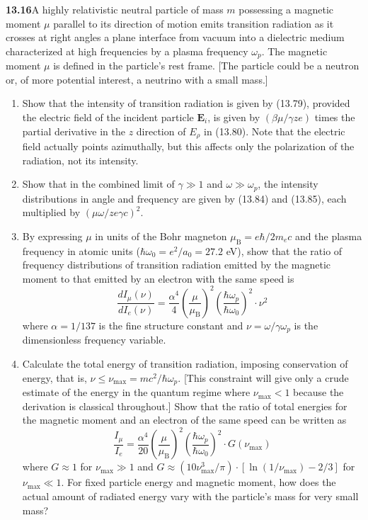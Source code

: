 \par\bigskip
\noindent\textbf{13.16}\quad A highly relativistic neutral particle of mass $m$ possessing a magnetic moment $\mu$ parallel to its direction of motion emits transition radiation as it crosses at right angles a plane interface from vacuum into a dielectric medium characterized at high frequencies by a plasma frequency $\omega_{p}$. The magnetic moment $\mu$ is defined in the particle's rest frame. [The particle could be a neutron or, of more potential interest, a neutrino with a small mass.]
\begin{enumerate}
\item[(a)] Show that the intensity of transition radiation is given by (13.79), provided the electric field of the incident particle $\mathbf{E}_{i}$, is given by $(\beta\mu/\gamma ze)$ times the partial derivative in the $z$ direction of $E_{\rho}$ in (13.80). Note that the electric field actually points azimuthally, but  this affects only the polarization of the radiation, not its intensity.
\item[(b)] Show that in the combined limit of $\gamma\gg1$ and $\omega\gg\omega_{p}$, the intensity distributions in angle and frequency are given by (13.84) and (13.85), each multiplied by $(\mu\omega/ze\gamma c)^{2}$.
\item[(c)] By expressing $\mu$ in units of the Bohr magneton $\mu_{\mathrm{B}}=e\hbar/2m_{e}c$ and the plasma frequency in atomic units ($\hbar\omega_{0}=e^{2}/a_{0}=27.2$ eV), show that the ratio of frequency distributions of transition radiation emitted by the magnetic moment to that emitted by an electron with the same speed is
\[
\frac{dI_{\mu}(\nu)}{dI_{e}(\nu)}=\frac{\alpha^{4}}{4}\left(\frac{\mu}{\mu_{\mathrm{B}}}\right)^{2}\!\left(\frac{\hbar\omega_{p}}{\hbar\omega_{0}}\right)^{2}\cdot\nu^{2}
\]
where $\alpha=1/137$ is the fine structure constant and $\nu=\omega/\gamma\omega_{p}$ is the dimensionless frequency variable.
\item[(d)] Calculate the total energy of transition radiation, imposing conservation of energy, that is, $\nu\leq\nu_{\max}=mc^{2}/\hbar\omega_{p}$. [This constraint will give only a crude estimate of the energy in the quantum regime where $\nu_{\max}<1$ because the derivation is classical throughout.] Show that the ratio of total energies for the magnetic moment and an electron of the same speed can be written as
\[
\frac{I_{\mu}}{I_{e}}=\frac{\alpha^{4}}{20}\left(\frac{\mu}{\mu_{\mathrm{B}}}\right)^{2}\!\left(\frac{\hbar\omega_{p}}{\hbar\omega_{0}}\right)^{2}\cdot G(\nu_{\max})
\]
where $G\approx1$ for $\nu_{\max}\gg1$ and $G\approx(10\nu_{\max}^{3}/\pi)\cdot[\ln(1/\nu_{\max})-2/3]$ for $\nu_{\max}\ll1$. For fixed particle energy and magnetic moment, how does the actual amount of radiated energy vary with the particle's mass for very small mass?
\end{enumerate}
